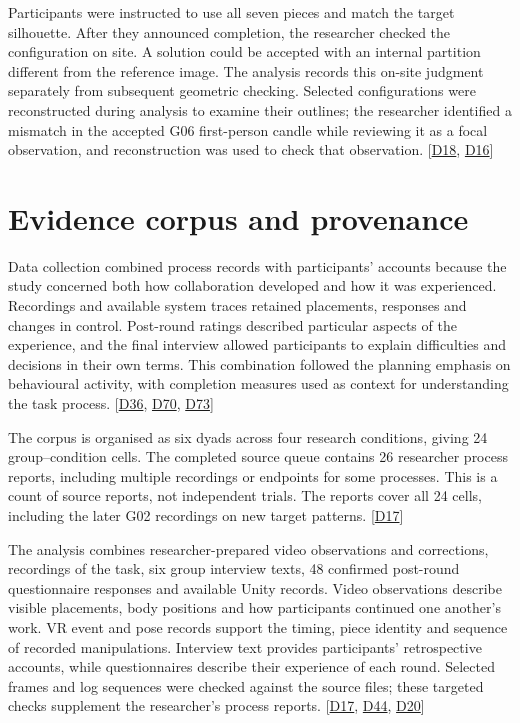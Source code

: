 Participants were instructed to use all seven pieces and match the target silhouette. After they announced completion, the researcher checked the configuration on site. A solution could be accepted with an internal partition different from the reference image. The analysis records this on-site judgment separately from subsequent geometric checking. Selected configurations were reconstructed during analysis to examine their outlines; the researcher identified a mismatch in the accepted G06 first-person candle while reviewing it as a focal observation, and reconstruction was used to check that observation. [\hyperlink{src:D18}{D18}, \hyperlink{src:D16}{D16}]


\section{Evidence corpus and provenance}\label{sec:4-3}

Data collection combined process records with participants' accounts because the study concerned both how collaboration developed and how it was experienced. Recordings and available system traces retained placements, responses and changes in control. Post-round ratings described particular aspects of the experience, and the final interview allowed participants to explain difficulties and decisions in their own terms. This combination followed the planning emphasis on behavioural activity, with completion measures used as context for understanding the task process. [\hyperlink{src:D36}{D36}, \hyperlink{src:D70}{D70}, \hyperlink{src:D73}{D73}]

The corpus is organised as six dyads across four research conditions, giving 24 group--condition cells. The completed source queue contains 26 researcher process reports, including multiple recordings or endpoints for some processes. This is a count of source reports, not independent trials. The reports cover all 24 cells, including the later G02 recordings on new target patterns. [\hyperlink{src:D17}{D17}]

The analysis combines researcher-prepared video observations and corrections, recordings of the task, six group interview texts, 48 confirmed post-round questionnaire responses and available Unity records. Video observations describe visible placements, body positions and how participants continued one another's work. VR event and pose records support the timing, piece identity and sequence of recorded manipulations. Interview text provides participants' retrospective accounts, while questionnaires describe their experience of each round. Selected frames and log sequences were checked against the source files; these targeted checks supplement the researcher's process reports. [\hyperlink{src:D17}{D17}, \hyperlink{src:D44}{D44}, \hyperlink{src:D20}{D20}]

